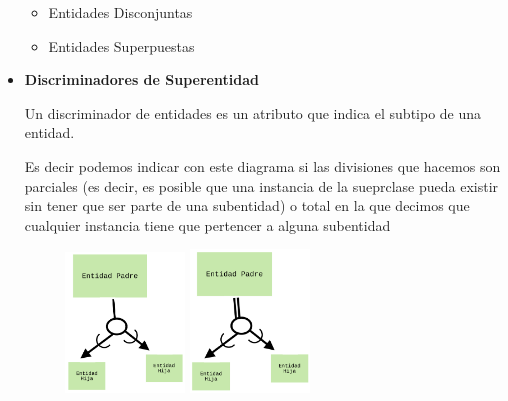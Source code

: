 \documentclass[12pt, fleqn]{report}                             %
\begin{document}
\begin{itemize}
                        \begin{itemize}
                            \item Entidades Disconjuntas
                            \item Entidades Superpuestas
                        \end{itemize}

                \clearpage


                \item
                    \textbf{Discriminadores de Superentidad}

                    Un discriminador de entidades es un atributo que indica el subtipo
                    de una entidad.

                    Es decir podemos indicar con este diagrama si las divisiones que hacemos
                    son parciales (es decir, es posible que una instancia de la sueprclase
                    pueda existir sin tener que ser parte de una subentidad) o total
                    en la que decimos que cualquier instancia tiene que pertencer a alguna
                    subentidad

                    \begin{figure}[h]
                        \centering
                        \includegraphics[width=0.30\textwidth]{EERD0}
                        \includegraphics[width=0.30\textwidth]{EERD1}
                    \end{figure}

            \end{itemize}
\end{document}
